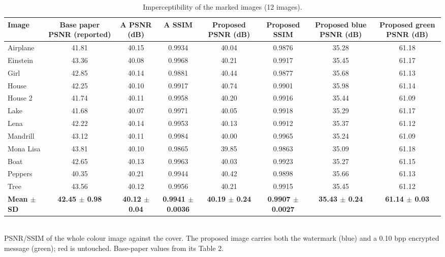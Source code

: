 \begin{table}[t]
\centering
\small
\caption{Imperceptibility of the marked images (12 images).}
\begin{tabular}{lccccccc}
\toprule
Image & Base paper PSNR (reported) & A PSNR (dB) & A SSIM & Proposed PSNR (dB) & Proposed SSIM & Proposed blue PSNR (dB) & Proposed green PSNR (dB) \\
\midrule
Airplane & 41.81 & 40.15 & 0.9934 & 40.04 & 0.9876 & 35.28 & 61.18 \\
Einstein & 43.36 & 40.08 & 0.9968 & 40.21 & 0.9917 & 35.45 & 61.17 \\
Girl & 42.85 & 40.14 & 0.9881 & 40.44 & 0.9877 & 35.68 & 61.13 \\
House & 42.25 & 40.10 & 0.9917 & 40.74 & 0.9901 & 35.98 & 61.14 \\
House 2 & 41.74 & 40.11 & 0.9958 & 40.20 & 0.9916 & 35.44 & 61.09 \\
Lake & 41.68 & 40.07 & 0.9971 & 40.05 & 0.9918 & 35.29 & 61.17 \\
Lena & 42.22 & 40.14 & 0.9953 & 40.13 & 0.9912 & 35.37 & 61.12 \\
Mandrill & 43.12 & 40.11 & 0.9984 & 40.00 & 0.9965 & 35.24 & 61.09 \\
Mona Lisa & 43.81 & 40.10 & 0.9865 & 39.85 & 0.9863 & 35.09 & 61.18 \\
Boat & 42.65 & 40.13 & 0.9963 & 40.03 & 0.9923 & 35.27 & 61.15 \\
Peppers & 40.35 & 40.21 & 0.9944 & 40.42 & 0.9898 & 35.66 & 61.13 \\
Tree & 43.56 & 40.12 & 0.9956 & 40.21 & 0.9915 & 35.45 & 61.12 \\
\textbf{Mean $\pm$ SD} & \textbf{42.45 $\pm$ 0.98} & \textbf{40.12 $\pm$ 0.04} & \textbf{0.9941 $\pm$ 0.0036} & \textbf{40.19 $\pm$ 0.24} & \textbf{0.9907 $\pm$ 0.0027} & \textbf{35.43 $\pm$ 0.24} & \textbf{61.14 $\pm$ 0.03} \\
\bottomrule
\end{tabular}
\\[2pt]\footnotesize PSNR/SSIM of the whole colour image against the cover. The proposed image carries both the watermark (blue) and a 0.10 bpp encrypted message (green); red is untouched. Base-paper values from its Table 2.
\end{table}
